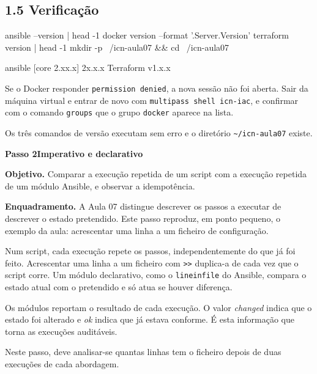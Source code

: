 \documentclass[11pt,a4paper]{article}
\newcommand{\passo}[2]{%
  \clearpage
  \begin{tcolorbox}[colback=SageMuted, colframe=SageMuted, coltext=white,
    boxrule=0pt, arc=4pt, left=14pt, right=14pt, top=10pt, bottom=10pt,
    before skip=0pt, after skip=0.6cm]
  {\Large\bfseries Passo #1}\hfill{\large\bfseries #2}
  \end{tcolorbox}
}
\newcommand{\cmd}[1]{\texttt{#1}}
\begin{document}
\subsection*{1.5 Verificação}

\begin{terminal}
ansible --version | head -1
docker version --format '{{.Server.Version}}'
terraform version | head -1
mkdir -p ~/icn-aula07 && cd ~/icn-aula07
\end{terminal}

\begin{saida}
ansible [core 2.xx.x]
2x.x.x
Terraform v1.x.x
\end{saida}

\begin{erro}
Se o Docker responder \cmd{permission denied}, a nova sessão não foi aberta. Sair da máquina virtual e entrar de novo com \cmd{multipass shell icn-iac}, e confirmar com o comando \cmd{groups} que o grupo \cmd{docker} aparece na lista.
\end{erro}

\begin{feito}
Os três comandos de versão executam sem erro e o diretório \cmd{\textasciitilde/icn-aula07} existe.
\end{feito}

\passo{2}{Imperativo e declarativo}

\textbf{Objetivo.} Comparar a execução repetida de um script com a execução repetida de um módulo Ansible, e observar a idempotência.

\textbf{Enquadramento.} A Aula 07 distingue descrever os passos a executar de descrever o estado pretendido. Este passo reproduz, em ponto pequeno, o exemplo da aula: acrescentar uma linha a um ficheiro de configuração.

\begin{teoria}
Num script, cada execução repete os passos, independentemente do que já foi feito. Acrescentar uma linha a um ficheiro com \cmd{>>} duplica-a de cada vez que o script corre. Um módulo declarativo, como o \cmd{lineinfile} do Ansible, compara o estado atual com o pretendido e só atua se houver diferença.

Os módulos reportam o resultado de cada execução. O valor \emph{changed} indica que o estado foi alterado e \emph{ok} indica que já estava conforme. É esta informação que torna as execuções auditáveis.

Neste passo, deve analisar-se quantas linhas tem o ficheiro depois de duas execuções de cada abordagem.
\end{teoria}
\end{document}
